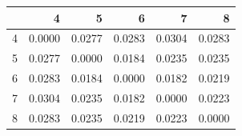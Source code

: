 \begin{tabular}{lrrrrr}
\toprule
 & 4 & 5 & 6 & 7 & 8 \\
\midrule
4 & 0.0000 & 0.0277 & 0.0283 & 0.0304 & 0.0283 \\
5 & 0.0277 & 0.0000 & 0.0184 & 0.0235 & 0.0235 \\
6 & 0.0283 & 0.0184 & 0.0000 & 0.0182 & 0.0219 \\
7 & 0.0304 & 0.0235 & 0.0182 & 0.0000 & 0.0223 \\
8 & 0.0283 & 0.0235 & 0.0219 & 0.0223 & 0.0000 \\
\bottomrule
\end{tabular}
